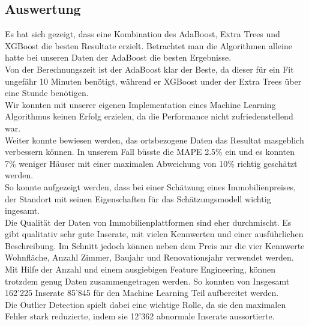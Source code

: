 \subsection{Auswertung}
Es hat sich gezeigt, dass eine Kombination des AdaBoost, Extra Trees und XGBoost die besten Resultate erzielt. Betrachtet man die Algorithmen alleine hatte bei unseren Daten der AdaBoost die besten Ergebnisse.\\
Von der Berechnungszeit ist der AdaBoost klar der Beste, da dieser für ein Fit ungefähr 10 Minuten benötigt, während er XGBoost under der Extra Trees über eine Stunde benötigen.\\
Wir konnten mit unserer eigenen Implementation eines Machine Learning Algorithmus keinen Erfolg erzielen, da die Performance nicht zufriedenstellend war.\\[2ex]
%
Weiter konnte bewiesen werden, das ortsbezogene Daten das Resultat masgeblich verbessern können. In unserem Fall büsste die MAPE 2.5\% ein und es konnten 7\% weniger Häuser mit einer maximalen Abweichung von 10\% richtig geschätzt werden.\\
So konnte aufgezeigt werden, dass bei einer Schätzung eines Immobilienpreises, der Standort mit seinen Eigenschaften für das Schätzungsmodell wichtig ingesamt.\\[2ex]
%
Die Qualität der Daten von Immobilienplattformen sind eher durchmischt. Es gibt qualitativ sehr gute Inserate, mit vielen Kennwerten und einer ausführlichen Beschreibung. Im Schnitt jedoch können neben dem Preis nur die vier Kennwerte Wohnfläche, Anzahl Zimmer, Baujahr und Renovationsjahr verwendet werden.\\
Mit Hilfe der Anzahl und einem ausgiebigen Feature Engineering, können trotzdem genug Daten zusammengetragen werden. So konnten von Insgesamt 162’225 Inserate 85’845 für den Machine Learning Teil aufbereitet werden.\\
Die Outlier Detection spielt dabei eine wichtige Rolle, da sie den maximalen Fehler stark reduzierte, indem sie 12'362 abnormale Inserate aussortierte.\\[2ex]
%
